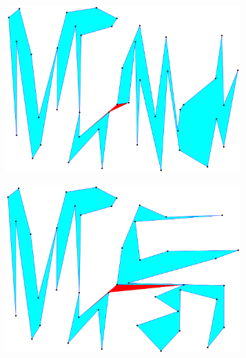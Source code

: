 \documentclass[conference]{IEEEtran}
\begin{document}
			\begin{figure}[htbp]
				\centering
				\begin{subfigure}{0.45\linewidth}
					\centering
					\includegraphics[width=0.99\textwidth]{fig1a.png}
					\caption{}
					\label{fig1a}
				\end{subfigure}
				\begin{subfigure}{0.45\linewidth}
					\centering
					\includegraphics[width=0.99\textwidth]{fig1b.png}
					\caption{}
					\label{fig1b}
				\end{subfigure}
				

\end{figure}
\end{document}

